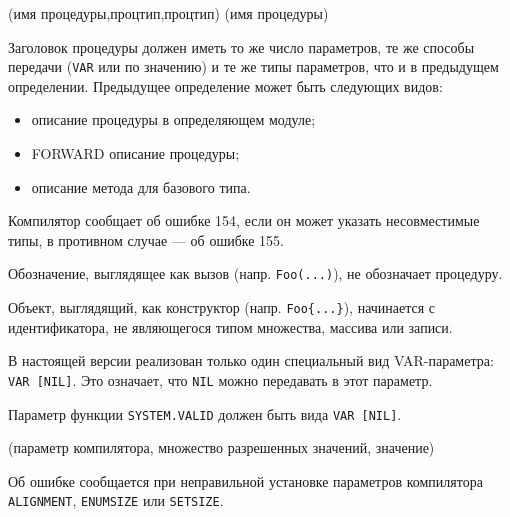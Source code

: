 (имя процедуры,процтип,процтип)
(имя процедуры)

Заголовок процедуры должен иметь то же число параметров,
те же способы передачи (\verb'VAR' или по значению) и те же типы параметров,
что и в предыдущем определении. Предыдущее определение может быть 
следующих видов:
\begin{itemize}
\item описание процедуры в определяющем модуле;
\item FORWARD описание процедуры;
\item описание метода для базового типа.
\end{itemize}

Компилятор сообщает об ошибке 154, если он может указать несовместимые типы,
в противном случае --- об ошибке 155.


Обозначение, выглядящее как вызов (напр. \verb'Foo(...)'), не 
обозначает процедуру.



Объект, выглядящий, как конструктор (напр. \verb'Foo{...}'),
начинается с идентификатора, не являющегося типом множества, массива или
записи.


В настоящей версии реализован только один специальный вид
VAR-параметра: \verb'VAR [NIL]'. 
Это означает, что \verb'NIL' можно передавать в этот параметр.


Параметр функции \verb'SYSTEM.VALID' должен быть вида \verb'VAR [NIL]'.

(параметр компилятора, множество разрешенных значений, значение)

Об ошибке сообщается при неправильной установке
параметров компилятора \verb'ALIGNMENT', \verb'ENUMSIZE'
или \verb'SETSIZE'.


